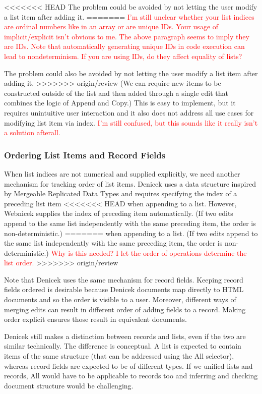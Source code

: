 \documentclass[sigconf,anonymous,screen]{acmart}
\newcommand{\ident}[1]{{\sffamily #1}}
\newcommand{\note}[1]{\textcolor{red}{#1}}
\begin{document}
<<<<<<< HEAD
The problem could be avoided by not letting the user modify a list item after adding it.
=======
\note{I'm still unclear whether your list indices are ordinal numbers like in an array or are unique IDs. Your usage of implicit/explicit isn't obvious to me. The above paragraph seems to imply they are IDs. Note that automatically generating unique IDs in code execution can lead to nondeterminism. If you are using IDs, do they affect equality of lists?}

The problem could also be avoided by not letting the user modify a list item after adding it.
>>>>>>> origin/review
(We can require new items to be constructed outside of the list and then added through a
single edit that combines the logic of \ident{Append} and \ident{Copy}.) This is easy to
implement, but it requires unintuitive user interaction and it also does not address all
use cases for modifying list item via index. \note{I'm still confused, but this sounds like it really isn't a solution afterall.}

\subsubsection*{Ordering List Items and Record Fields}
When list indices are not numerical and supplied explicitly, we need another mechanism for
tracking order of list items. Denicek uses a data structure inspired by Mergeable Replicated
Data Types \cite{kaki-2019-mrdts} and requires specifying the index of a preceding list item
<<<<<<< HEAD
when appending to a list. However, Webnicek supplies the index of preceding item automatically.
(If two edits append to the same list independently with the same preceding item, the order
is non-deterministic.)
=======
when appending to a list. (If two edits append to the same list independently with the same
preceding item, the order is non-deterministic.) \note{Why is this needed? I let the order of operations determine the list order. }
>>>>>>> origin/review

Note that Denicek uses the same mechanism for record fields. Keeping record fields ordered is
desirable because Denicek documents map directly to HTML documents and so the order is visible
to a user. Moreover, different ways of merging edits can result in different order of adding fields
to a record. Making order explicit ensures those result in equivalent documents.

Denicek still makes a distinction between records and lists, even if the two are similar
technically. The difference is conceptual. A list is expected to contain items of the
same structure (that can be addressed using the \ident{All} selector), whereas record fields
are expected to be of different types. If we unified lists and records, \ident{All} would have
to be applicable to records too and inferring and checking document structure would be
challenging.
\end{document}
